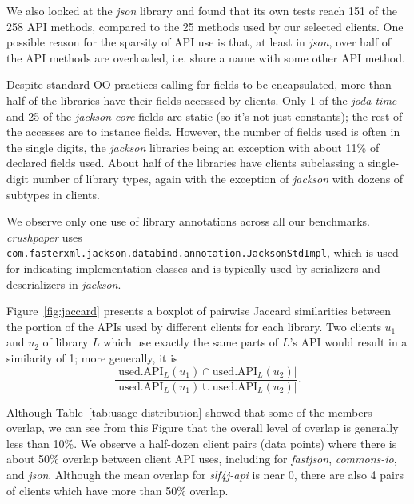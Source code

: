 We also looked at the \emph{json} library and found that its own tests reach 151
of the 258 API methods, compared to the 25 methods used by our selected
clients. One possible reason for the sparsity of API use is that, at least in \emph{json}, over half of the API methods are overloaded, i.e. share a name with
some other API method.


Despite standard OO practices calling for fields to be encapsulated, more than half of the libraries have their fields accessed by clients. Only 1 of the \emph{joda-time} and 25 of the \emph{jackson-core} fields are static (so it's not just constants); the rest of the accesses are to instance fields.
However, the number of fields used is often in the single digits,
the \emph{jackson} libraries being an exception with about 11\% of declared fields used.
About half of the libraries have clients subclassing a
single-digit number of library types, again with the exception of
\emph{jackson} with dozens of subtypes in clients.

We observe only one use of library annotations across all our benchmarks. \emph{crushpaper} uses \texttt{com.fasterxml.jackson.databind.annotation.JacksonStdImpl}, which is used for indicating implementation classes and is typically used by serializers and deserializers in \emph{jackson}.

Figure~\ref{fig:jaccard} presents a boxplot of
pairwise Jaccard similarities between the portion of
the APIs used by different clients for each library. Two clients $u_1$ and $u_2$ 
of library $L$ which use exactly the same parts of $L$'s API would result in a similarity of 1;
more generally, it is
\[ \frac{|\mbox{used.API}_L(u_1) \cap \mbox{used.API}_L(u_2)|}{|\mbox{used.API}_L(u_1) \cup \mbox{used.API}_L(u_2)|}. \]

Although Table~\ref{tab:usage-distribution} showed that some of the members overlap, we can
see from this Figure that the overall level of overlap is generally less than 10\%. We observe
a half-dozen client pairs (data points) where there is about 50\% overlap between client API uses, including for \emph{fastjson},
\emph{commons-io}, and \emph{json}. Although the mean overlap for \emph{slf4j-api} is near 0, there are also 4 pairs of clients which have more than 50\% overlap.

